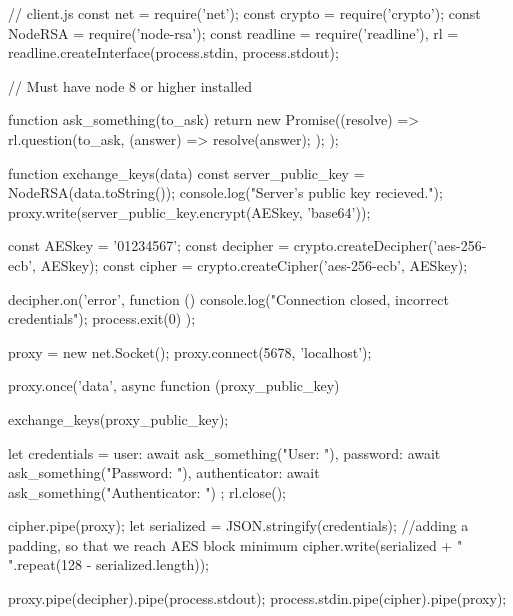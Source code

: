 \begin{Answer}[ref={proxy-auth}]

\begin{js}
// client.js
const net = require('net');
const crypto = require('crypto');
const NodeRSA = require('node-rsa');
const readline = require('readline'), rl = readline.createInterface(process.stdin, process.stdout);

// Must have node 8 or higher installed


function ask_something(to_ask) {
    return new Promise((resolve) => {
        rl.question(to_ask, (answer) => {
            resolve(answer);
        });
    });
}


function exchange_keys(data) {
    const server_public_key = NodeRSA(data.toString());
    console.log("Server's public key recieved.");
    proxy.write(server_public_key.encrypt(AESkey, 'base64'));
}

const AESkey = '01234567';
const decipher = crypto.createDecipher('aes-256-ecb', AESkey);
const cipher = crypto.createCipher('aes-256-ecb', AESkey);

decipher.on('error', function () {
    console.log("Connection closed, incorrect credentials");
    process.exit(0)
});

proxy = new net.Socket();
proxy.connect(5678, 'localhost');

proxy.once('data', async function (proxy_public_key) {
    exchange_keys(proxy_public_key);

    let credentials = {
        user: await ask_something("User: "),
        password: await ask_something("Password: "),
        authenticator: await ask_something("Authenticator: ")
    };
    rl.close();

    cipher.pipe(proxy);
    let serialized = JSON.stringify(credentials);
    //adding a padding, so that we reach AES block minimum
    cipher.write(serialized + " ".repeat(128 - serialized.length));

    proxy.pipe(decipher).pipe(process.stdout);
    process.stdin.pipe(cipher).pipe(proxy);

}
\end{js}
\end{Answer}
